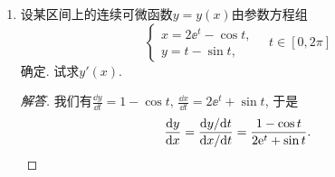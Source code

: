 \begin{2a}
\begin{enumerate}
\[\begin{cases}
    x^2+2u^2+3v^2+w^4=1,\\x+u+v+w=0
\end{cases}\]确定. 试求\(\frac{\partial u}{\partial x},\frac{\partial w}{\partial u},\frac{\partial v}{\partial x},\frac{\partial w}{\partial x}.\)
\begin{proof}[解答]
分别对\(x,u\)求偏导得到\[\begin{cases}
2x+6v\dfrac{\partial v}{\partial x}+4w^3\dfrac{\partial w}{\partial x}=0,\\
1+\dfrac{\partial v}{\partial x}+\dfrac{\partial w}{\partial x}=0,
\end{cases}\quad\begin{cases}
4u+6v\dfrac{\partial v}{\partial u}+4w^3\dfrac{\partial w}{\partial u}=0,\\
1+\dfrac{\partial v}{\partial u}+\dfrac{\partial w}{\partial u}=0,
\end{cases}\]解得\(\frac{\partial v}{\partial u}=\frac{2w^3-2u}{3v-2w^3},
\frac{\partial w}{\partial u}=\frac{2u-3v}{3v-2w^3},
\frac{\partial v}{\partial x}=\frac{2w^3-x}{3v-2w^3},
\frac{\partial w}{\partial x}=\frac{x-3v}{3v-2w^3}.\) 于是
\[\frac{\partial u}{\partial x}=\frac{\partial w/\partial x}{\partial w/\partial u}=\frac{x-3v}{2u-3v}.\qedhere\]
\end{proof}
\item 设某区间上的连续可微函数\(y=y(x)\)由参数方程组\[\begin{cases}
    x=2\ee^t-\cos t,\\ y=t-\sin t,
\end{cases}\quad t\in [0,2\pi]\]确定. 试求\(y'(x)\).
\begin{proof}[解答]
我们有\(\frac{\dd y}{\dd t}=1-\cos t,\,\frac{\dd x}{\dd t}=2\ee^t+\sin t\), 于是
\[\frac{\mathrm{d} y}{\mathrm{d} x}=\frac{\mathrm{d} y/\mathrm{d} t}{\mathrm{d} x/\mathrm{d} t}
=\frac{1-\cos t}{2\mathrm{e}^t+\sin t}.\qedhere\]
\end{proof}
\end{enumerate}
\end{2a}
